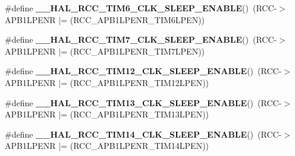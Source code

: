 \begin{DoxyCompactItemize}
\item 
\mbox{\label{group___r_c_c_ex___peripheral___clock___sleep___enable___disable_ga906c45719dcf2113473f2c3281926368}} 
\#define {\bfseries \+\_\+\+\_\+\+H\+A\+L\+\_\+\+R\+C\+C\+\_\+\+T\+I\+M6\+\_\+\+C\+L\+K\+\_\+\+S\+L\+E\+E\+P\+\_\+\+E\+N\+A\+B\+LE}()~(R\+CC-\/$>$A\+P\+B1\+L\+P\+E\+NR $\vert$= (R\+C\+C\+\_\+\+A\+P\+B1\+L\+P\+E\+N\+R\+\_\+\+T\+I\+M6\+L\+P\+EN))
\item 
\mbox{\label{group___r_c_c_ex___peripheral___clock___sleep___enable___disable_ga2a1c22a18251e0dac7f77ba8398af543}} 
\#define {\bfseries \+\_\+\+\_\+\+H\+A\+L\+\_\+\+R\+C\+C\+\_\+\+T\+I\+M7\+\_\+\+C\+L\+K\+\_\+\+S\+L\+E\+E\+P\+\_\+\+E\+N\+A\+B\+LE}()~(R\+CC-\/$>$A\+P\+B1\+L\+P\+E\+NR $\vert$= (R\+C\+C\+\_\+\+A\+P\+B1\+L\+P\+E\+N\+R\+\_\+\+T\+I\+M7\+L\+P\+EN))
\item 
\mbox{\label{group___r_c_c_ex___peripheral___clock___sleep___enable___disable_gad8b3e0a9f9cb30a02d3c3e5070a9ee29}} 
\#define {\bfseries \+\_\+\+\_\+\+H\+A\+L\+\_\+\+R\+C\+C\+\_\+\+T\+I\+M12\+\_\+\+C\+L\+K\+\_\+\+S\+L\+E\+E\+P\+\_\+\+E\+N\+A\+B\+LE}()~(R\+CC-\/$>$A\+P\+B1\+L\+P\+E\+NR $\vert$= (R\+C\+C\+\_\+\+A\+P\+B1\+L\+P\+E\+N\+R\+\_\+\+T\+I\+M12\+L\+P\+EN))
\item 
\mbox{\label{group___r_c_c_ex___peripheral___clock___sleep___enable___disable_gae00ec905f6763aaaa93e6ed69afbd48c}} 
\#define {\bfseries \+\_\+\+\_\+\+H\+A\+L\+\_\+\+R\+C\+C\+\_\+\+T\+I\+M13\+\_\+\+C\+L\+K\+\_\+\+S\+L\+E\+E\+P\+\_\+\+E\+N\+A\+B\+LE}()~(R\+CC-\/$>$A\+P\+B1\+L\+P\+E\+NR $\vert$= (R\+C\+C\+\_\+\+A\+P\+B1\+L\+P\+E\+N\+R\+\_\+\+T\+I\+M13\+L\+P\+EN))
\item 
\mbox{\label{group___r_c_c_ex___peripheral___clock___sleep___enable___disable_gaabdcae7edf493254fee3064775ab5023}} 
\#define {\bfseries \+\_\+\+\_\+\+H\+A\+L\+\_\+\+R\+C\+C\+\_\+\+T\+I\+M14\+\_\+\+C\+L\+K\+\_\+\+S\+L\+E\+E\+P\+\_\+\+E\+N\+A\+B\+LE}()~(R\+CC-\/$>$A\+P\+B1\+L\+P\+E\+NR $\vert$= (R\+C\+C\+\_\+\+A\+P\+B1\+L\+P\+E\+N\+R\+\_\+\+T\+I\+M14\+L\+P\+EN))

\end{DoxyCompactItemize}
